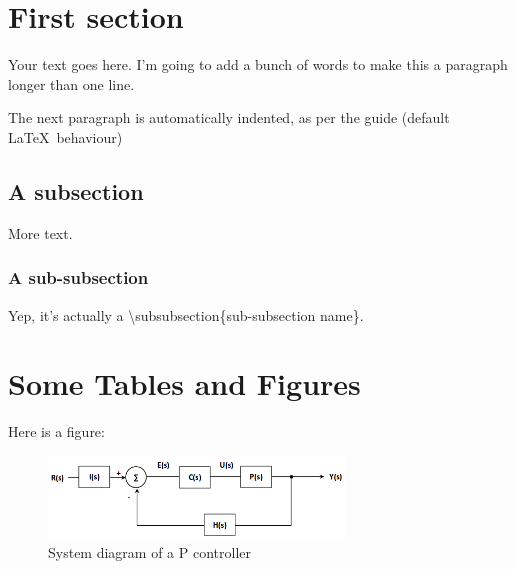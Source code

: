 \documentclass[12pt]{article}
\begin{document}
	\begin{abstract}
		This is a \LaTeX\ style that aims to match the uWaterloo SYDE style guide because doing work term report formatting makes me want to ahkerfg kasjrgu dfhgukia rgfzjkxfh aeguxdfgzxyu auisdrjgfh ifawuiegf isdurgfia uewrzcjbn zkjdfcvmba weukirydfui erjk t  zxcg awr sdfh stry sdfh yukstrh f nynyuikjef acse fcvdt ukyivegt hac erctse rgc.
	\end{abstract}

	\tableofcontents
	\newpage

	\listoffigures
	\newpage
	\listoftables
	\newpage

	\startarabicpagenumbers

	\section{First section}

	Your text goes here. I'm going to add a bunch of words to make this a paragraph longer than one line.

	The next paragraph is automatically indented, as per the guide (default \LaTeX\ behaviour)

	\subsection{A subsection}

	More text.

	\subsubsection{A sub-subsection}

	Yep, it's actually a \textbackslash subsubsection\{sub-subsection name\}.

	\section{Some Tables and Figures}

	Here is a figure:

	\begin{figure}[!ht]
	\centering
	\includegraphics[width=0.7\textwidth]{pcontroller}
	\caption{System diagram of a P controller}
	\label{pcontroller}
	\end{figure}
\end{document}
